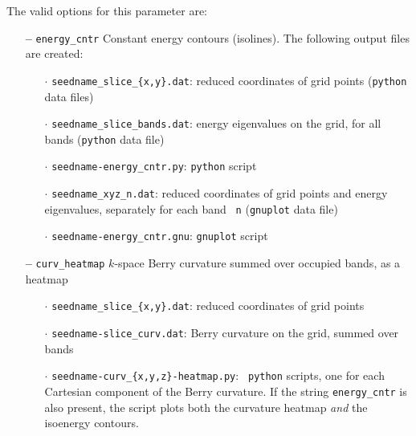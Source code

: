 The valid options for this parameter are:
\begin{itemize}

\item[{\bf --}] \verb#energy_cntr# Constant energy contours
  (isolines). The following output files are created:

  \begin{itemize}

  \item[$\cdot$] {\tt seedname\_slice\_\{x,y\}.dat}: reduced coordinates
    of grid points ({\tt python} data files)

  \item[$\cdot$] {\tt seedname\_slice\_bands.dat}: energy eigenvalues
    on the grid, for all bands ({\tt python} data file)

  \item[$\cdot$] {\tt seedname-energy\_cntr.py}: {\tt python} script

  \item[$\cdot$] {\tt seedname\_xyz\_n.dat}: reduced coordinates of
    grid points and energy eigenvalues, separately for each band {\tt
      n} ({\tt gnuplot} data file)

  \item[$\cdot$] {\tt seedname-energy\_cntr.gnu}: {\tt gnuplot} script

  \end{itemize}

\item[{\bf --}] \verb#curv_heatmap# $k$-space Berry curvature summed over
  occupied bands, as a heatmap

  \begin{itemize}

  \item[$\cdot$] {\tt seedname\_slice\_\{x,y\}.dat}: reduced coordinates
    of grid points 
    
  \item[$\cdot$] {\tt seedname-slice\_curv.dat}: Berry curvature 
    on the grid, summed over bands
    
  \item[$\cdot$] {\tt seedname-curv\_\{x,y,z\}-heatmap.py}: {\tt
      python} scripts, one for each Cartesian component of the Berry
    curvature. If the string {\tt energy\_cntr} is also present, the
    script plots both the curvature heatmap {\it and} the isoenergy
    contours.
    
  \end{itemize}


\end{itemize}
